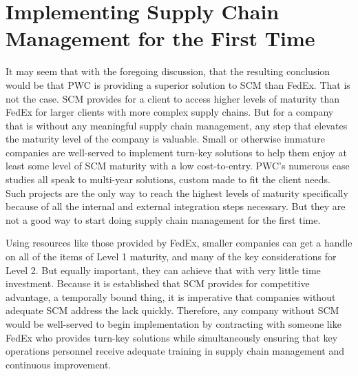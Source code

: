 \documentclass[man]{apa7}
\begin{document}
\section{Implementing Supply Chain Management for the First Time}
\label{sec:org357cef9}

It may seem that with the foregoing discussion, that the resulting conclusion would be that PWC is providing a superior solution to SCM than FedEx. That is not the case. SCM provides for a client to access higher levels of maturity than FedEx for larger clients with more complex supply chains. But for a company that is without any meaningful supply chain management, any step that elevates the maturity level of the company is valuable. Small or otherwise immature companies are well-served to implement turn-key solutions to help them enjoy at least some level of SCM maturity with a low cost-to-entry. PWC's numerous case studies all speak to multi-year solutions, custom made to fit the client needs. Such projects are the only way to reach the highest levels of maturity specifically because of all the internal and external integration steps necessary.  But they are not a good way to start doing supply chain management for the first time.

Using resources like those provided by FedEx, smaller companies can get a handle on all of the items of Level 1 maturity, and many of the key considerations for Level 2. But equally important, they can achieve that with very little time investment. Because it is established that SCM provides for competitive advantage, a temporally bound thing, it is imperative that companies without adequate SCM address the lack quickly. Therefore, any company without SCM would be well-served to begin implementation by contracting with someone like FedEx who provides turn-key solutions while simultaneously ensuring that key operations personnel receive adequate training in supply chain management and continuous improvement.
\parencite{zhouMediatingRoleEmployee2014}
\parencite{Bauer,wittgensteinPhilosophicalInvestigations1973,winermanCriminalProfilingReality2004}

\parencite[testing][]{zhuBriefExposureMisinformation2012} 
\printbibliography
\end{document}
